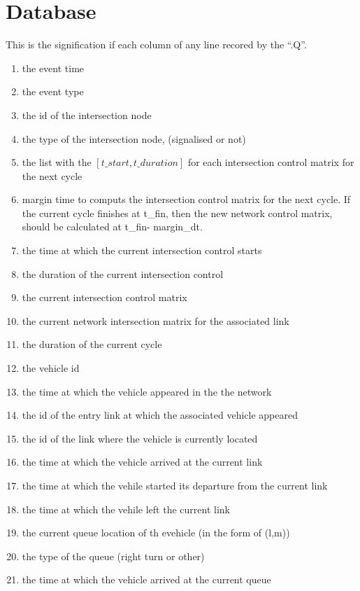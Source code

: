
\section{Database}

This is the signification if each column of any line recored by the ``.Q''.

\begin{enumerate}
\item the event time
\item the event type
\item the id of the intersection node
\item the type of the intersection node, (signalised or not)
\item the list with the $[t\_start,t\_duration]$ for each intersection control matrix for the next cycle
\item margin time to computs the intersection control matrix for the next cycle. If the current cycle finishes at t\_fin, then the new network control matrix, should be calculated at t\_fin- margin\_dt.
\item the time at which the current  intersection control starts
\item the duration of the current intersection control
\item the current intersection control matrix
\item the current network intersection matrix for the associated link 
\item the duration of the current cycle
\item the vehicle id
\item the time at which the vehicle appeared in the the network
\item the id of the entry link at which the associated vehicle appeared
\item the id of the link where the vehicle is currently located
\item the time at which the vehicle arrived at the current link
\item the time at which the vehile started its departure from the current link
\item the time at which the vehile left the current link
\item the current queue location of th evehicle (in the form of (l,m))
\item the type of the queue (right turn or other)
\item the time at which the vehicle arrived at the current queue

\end{enumerate}
